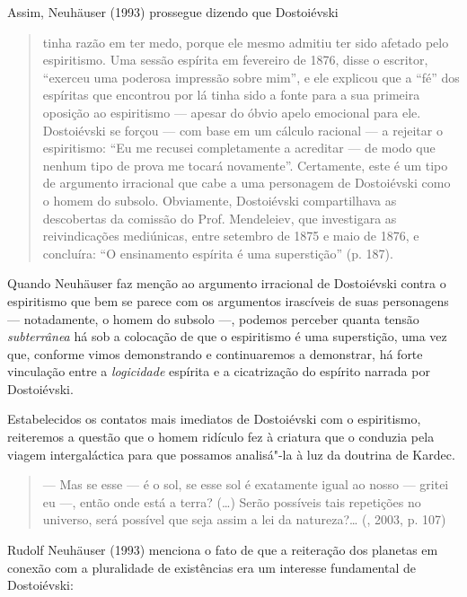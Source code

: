 Assim, Neuhäuser (1993) prossegue dizendo que Dostoiévski

\begin{quote}
tinha razão em ter medo, porque ele mesmo admitiu ter sido afetado pelo
espiritismo. Uma sessão espírita em fevereiro de 1876, disse o escritor,
``exerceu uma poderosa impressão sobre mim'', e ele explicou que a
``fé'' dos espíritas que encontrou por lá tinha sido a fonte para a sua
primeira oposição ao espiritismo --- apesar do óbvio apelo emocional para
ele. Dostoiévski se forçou --- com base em um cálculo racional --- a
rejeitar o espiritismo: ``Eu me recusei completamente a acreditar --- de
modo que nenhum tipo de prova me tocará novamente''. Certamente, este é
um tipo de argumento irracional que cabe a uma personagem de Dostoiévski
como o homem do subsolo. Obviamente, Dostoiévski compartilhava as
descobertas da comissão do Prof. Mendeleiev, que investigara as
reivindicações mediúnicas, entre setembro de 1875 e maio de 1876, e
concluíra: ``O ensinamento espírita é uma superstição'' (p. 187).
\end{quote}

Quando Neuhäuser faz menção ao argumento irracional de Dostoiévski
contra o espiritismo que bem se parece com os argumentos irascíveis de
suas personagens --- notadamente, o homem do subsolo ---, podemos perceber
quanta tensão \emph{subterrânea} há sob a colocação de que o espiritismo
é uma superstição, uma vez que, conforme vimos demonstrando e
continuaremos a demonstrar, há forte vinculação entre a
\emph{logicidade} espírita e a cicatrização do espírito narrada por
Dostoiévski.

Estabelecidos os contatos mais imediatos de Dostoiévski com o
espiritismo, reiteremos a questão que o homem ridículo fez à criatura
que o conduzia pela viagem intergaláctica para que possamos analisá"-la à
luz da doutrina de Kardec.

\begin{quote}
--- Mas se esse --- é o sol, se esse sol é exatamente igual ao nosso ---
gritei eu ---, então onde está a terra? (\ldots{}) Serão possíveis tais
repetições no universo, será possível que seja assim a lei da
natureza?\ldots{} (, 2003, p. 107)
\end{quote}

Rudolf Neuhäuser (1993) menciona o fato de que a reiteração dos planetas
em conexão com a pluralidade de existências era um interesse fundamental
de Dostoiévski:

